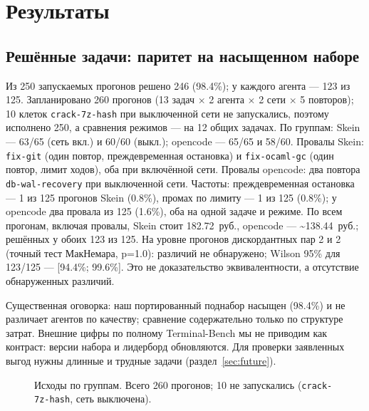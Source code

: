 \documentclass[11pt,a4paper]{article}
\begin{document}
\section{Результаты}

\subsection{Решённые задачи: паритет на насыщенном наборе}

Из 250 запускаемых прогонов решено 246 (98.4\%); у каждого агента --- 123 из 125.
Запланировано 260 прогонов (13 задач $\times$ 2 агента $\times$ 2 сети $\times$ 5 повторов);
10 клеток \texttt{crack-7z-hash} при выключенной сети не запускались, поэтому исполнено 250,
а сравнения режимов --- на 12 общих задачах. По группам: Skein --- 63/65 (сеть вкл.) и 60/60 (выкл.); opencode --- 65/65 и 58/60.
Провалы Skein: \texttt{fix-git} (один повтор, преждевременная остановка) и
\texttt{fix-ocaml-gc} (один повтор, лимит ходов), оба при включённой сети. Провалы
opencode: два повтора \texttt{db-wal-recovery} при выключенной сети. Частоты: преждевременная
остановка --- 1 из 125 прогонов Skein (0.8\%), промах по лимиту --- 1 из 125 (0.8\%); у
opencode два провала из 125 (1.6\%), оба на одной задаче и режиме. По всем прогонам, включая
провалы, Skein стоит 182.72~руб., opencode --- \textasciitilde138.44~руб.; решённых у обоих
123 из 125. На уровне прогонов дискордантных пар 2 и 2 (точный тест МакНемара, p=1.0):
различий не обнаружено; Wilson 95\% для 123/125 --- [94.4\%; 99.6\%]. Это не доказательство
эквивалентности, а отсутствие обнаруженных различий.

Существенная оговорка: наш портированный поднабор насыщен (98.4\%) и не различает
агентов по качеству; сравнение содержательно только по структуре затрат. Внешние цифры по
полному Terminal-Bench мы не приводим как контраст: версии набора и лидерборд обновляются.
Для проверки заявленных выгод нужны длинные и трудные задачи (раздел~\ref{sec:future}).

\begin{figure}[t]
\centering
{}
\caption{Исходы по группам. Всего 260 прогонов; 10 не запускались (\texttt{crack-7z-hash},
сеть выключена).}
\label{fig:solved}
\end{figure}
\end{document}
